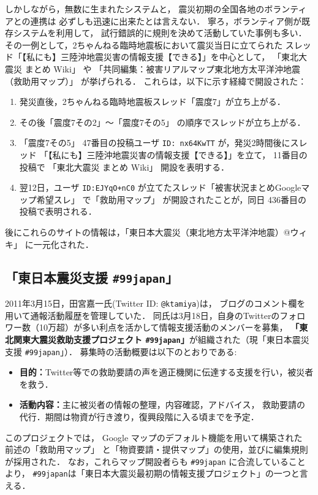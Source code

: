 \documentclass[japanese]{jnlp_1.4}
\begin{document}
しかしながら，無数に生まれたシステムと，
震災初期の全国各地のボランティアとの連携は
必ずしも迅速に出来たとは言えない．
寧ろ，ボランティア側が既存システムを利用して，
試行錯誤的に規則を決めて活動していた事例も多い．
その一例として，2ちゃんねる臨時地震板において震災当日に立てられた
スレッド「【私にも】三陸沖地震災害の情報支援【できる】」\cite{2ch}を中心として，
「東北大震災 まとめ Wiki」\cite{atwiki} や
「共同編集：被害リアルマップ東北地方太平洋沖地震（救助用マップ）」\cite{map1} が挙げられる．
これらは，以下に示す経緯で開設された：
\begin{enumerate}
\item 発災直後，2ちゃんねる臨時地震板スレッド「震度7」\cite{2ch_shindo7_1}が立ち上がる．
\item その後「震度7その2」〜「震度7その5」\cite{2ch_shindo7_2,2ch_shindo7_3,2ch_shindo7_4,2ch_shindo7_5} 
  の順序でスレッドが立ち上がる．
\item 「震度7その5」\cite{2ch_shindo7_5} 47番目の投稿ユーザ {\tt ID: nx64KwTT} が，発災2時間後にスレッド
「【私にも】三陸沖地震災害の情報支援【できる】」\cite{2ch}を立て，
  11番目の投稿で
  「東北大震災 まとめ Wiki」\cite{atwiki} 開設を表明する．
\item 翌12日，ユーザ {\tt ID:EJYqO+nC0} が立てたスレッド「被害状況まとめGoogleマップ希望スレ」 \cite{2ch_map}
  で「救助用マップ」\cite{map1} が開設されたことが，同日 \cite{2ch} 436番目の投稿で表明される．
\end{enumerate}
後にこれらのサイトの情報は，「東日本大震災（東北地方太平洋沖地震）@ウィキ」 に一元化された．



\subsection{「東日本震災支援  {\tt \#99japan}」}
\label{99japan}

2011年3月15日，田宮嘉一氏(Twitter ID: {\tt @ktamiya})は，
ブログのコメント欄を用いて通報活動履歴を管理していた\cite{ktamiya}．
同氏は3月18日，自身のTwitterのフォロワー数（10万超）が多い利点を活かして情報支援活動のメンバーを募集，
{\bf 「東北関東大震災救助支援プロジェクト {\tt \#99japan}」}が組織された（現「東日本震災支援 {\tt \#99japan}」）．
募集時の活動概要は以下のとおりである\cite{99japan1}:
\begin{itemize}
\item {\bf 目的：}Twitter等での救助要請の声を適正機関に伝達する支援を行い，被災者を救う．
\item {\bf 活動内容：}主に被災者の情報の整理，内容確認，アドバイス，
  救助要請の代行．期間は物資が行き渡り，復興段階に入る頃までを予定．
\end{itemize}
このプロジェクトでは，
Google マップのデフォルト機能を用いて構築された
前述の「救助用マップ」\cite{map1} と「物資要請・提供マップ」\cite{map2}の使用，並びに編集規則が採用された．
なお，これらマップ開設者らも {\tt \#99japan} に合流していることより，
{\tt \#99japan}は「東日本大震災最初期の情報支援プロジェクト」の一つと言える．
\end{document}
